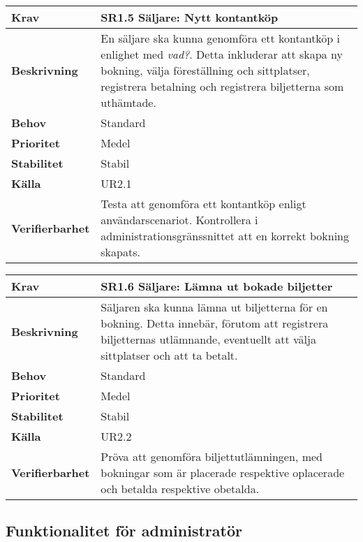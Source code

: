 \documentclass[a4paper, twoside, 11pt, titlepage]{article}
\begin{document}
	\begin{tabular} { p{2.6cm} p{12.5cm} }
		\hline
		\sffamily\textbf{Krav} & \sffamily\textbf{SR1.5 Säljare: Nytt kontantköp } \\
		\hline
		\sffamily\textbf{Beskrivning} & En säljare ska kunna genomföra ett kontantköp i enlighet med \emph{vad?}. Detta inkluderar att skapa ny bokning, välja föreställning och sittplatser, registrera betalning och registrera biljetterna som uthämtade.  \\
		\hline
		\sffamily\textbf{Behov} & Standard  \\
		\hline
		\sffamily\textbf{Prioritet} & Medel  \\
		\hline
		\sffamily\textbf{Stabilitet} & Stabil  \\
		\hline
		\sffamily\textbf{Källa} & UR2.1  \\
		\hline
		\sffamily\textbf{Verifierbarhet} & Testa att genomföra ett kontantköp enligt användarscenariot. Kontrollera i administrationsgränssnittet att en korrekt bokning skapats.  \\
		\hline
	\end{tabular}
	\vspace{6mm}

	\begin{tabular} { p{2.6cm} p{12.5cm} }
		\hline
		\sffamily\textbf{Krav} & \sffamily\textbf{SR1.6 Säljare: Lämna ut bokade biljetter } \\
		\hline
		\sffamily\textbf{Beskrivning} & Säljaren ska kunna lämna ut biljetterna för en bokning. Detta innebär, förutom att registrera biljetternas utlämnande, eventuellt att välja sittplatser och att ta betalt.  \\
		\hline
		\sffamily\textbf{Behov} & Standard  \\
		\hline
		\sffamily\textbf{Prioritet} & Medel  \\
		\hline
		\sffamily\textbf{Stabilitet} & Stabil  \\
		\hline
		\sffamily\textbf{Källa} & UR2.2  \\
		\hline
		\sffamily\textbf{Verifierbarhet} & Pröva att genomföra biljettutlämningen, med bokningar som är placerade respektive oplacerade och betalda respektive obetalda.  \\
		\hline
	\end{tabular}


	\subsection{Funktionalitet för administratör}
\end{document}
